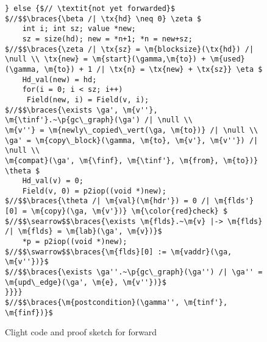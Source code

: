 \begin{figure*}[!ht]
\begin{lstlisting}[multicols=2]
   } else {$// \textit{not yet forwarded}$
$//$$\braces{\beta /| \tx{hd} \neq 0} \zeta $
    int i; int sz; value *new;
    sz = size(hd); new = *n+1; *n = new+sz;
$//$$\braces{\zeta /| \tx{sz} = \m{blocksize}(\tx{hd}) /| \null \\ \tx{new} = \m{start}(\gamma,\m{to}) + \m{used}(\gamma, \m{to}) + 1 /| \tx{n} = \tx{new} + \tx{sz}} \eta $      
    Hd_val(new) = hd; 
    for(i = 0; i < sz; i++) 
     Field(new, i) = Field(v, i);
$//$$\braces{\exists \ga', \m{v''}, \m{\tinf'}.~\p{gc\_graph}(\ga') /| \null \\ 
\m{v''} = \m{newly\_copied\_vert(\ga, \m{to})} /| \null \\ \ga' = \m{copy\_block}(\gamma, \m{to}, \m{v'}, \m{v''}) /| \null \\ 
\m{compat}(\ga', \m{\finf}, \m{\tinf'}, \m{from}, \m{to})} \theta $
    Hd_val(v) = 0;
    Field(v, 0) = p2iop((void *)new);
$//$$\braces{\theta /| \m{val}(\m{hdr'}) = 0 /| \m{flds'}[0] = \m{copy}(\ga, \m{v'})} \m{\color{red}check} $
$//$$\searrow$$\braces{\exists \m{flds}.~\m{v} |-> \m{flds} /| \m{flds} = \m{lab}(\ga', \m{v})}$
    *p = p2iop((void *)new);
$//$$\swarrow$$\braces{\m{flds}[0] := \m{vaddr}(\ga, \m{v''})}$
$//$$\braces{\exists \ga''.~\p{gc\_graph}(\ga'') /| \ga'' = \m{upd\_edge}(\ga', \m{e}, \m{v''})}$
}}}}
$//$$\braces{\m{postcondition}(\gamma'', \m{tinf'}, \m{finf})}$
\end{lstlisting}
\vspace{-0.4em}
\caption{Clight code and proof sketch for forward}
\label{fig:forward}
\vspace{-1em}
\end{figure*}

